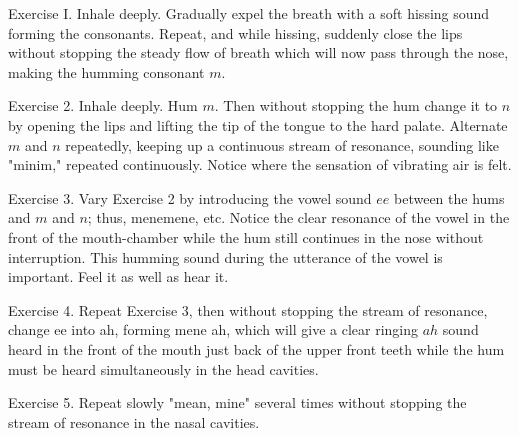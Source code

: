 \documentclass[10pt]{article}
\begin{document}
Exercise I. Inhale deeply. Gradually expel the breath with a soft hissing sound forming the consonants. Repeat, and while hissing, suddenly close the lips without stopping the steady flow of breath which will now pass through the nose, making the humming consonant $m$.

Exercise 2. Inhale deeply. Hum $m$. Then without stopping the hum change it to $n$ by opening the lips and lifting the tip of the tongue to the hard palate. Alternate $m$ and $n$ repeatedly, keeping up a continuous stream of resonance, sounding like "minim," repeated continuously. Notice where the sensation of vibrating air is felt.

Exercise 3. Vary Exercise 2 by introducing the vowel sound $e e$ between the hums and $m$ and $n$; thus, menemene, etc. Notice the clear resonance of the vowel in the front of the mouth-chamber while the hum still continues in the nose without interruption. This humming sound during the utterance of the vowel is important. Feel it as well as hear it.

Exercise 4. Repeat Exercise 3, then without stopping the stream of resonance, change ee into ah, forming mene ah, which will give a clear ringing $a h$ sound heard in the front of the mouth just back of the upper front teeth while the hum must be heard simultaneously in the head cavities.

Exercise 5. Repeat slowly "mean, mine" several times without stopping the stream of resonance in the nasal cavities.
\end{document}
